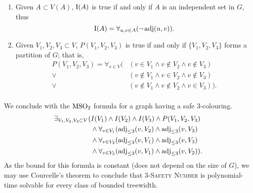 \begin{solution}
\begin{enumerate}
        \item Given $A \subset V(A)$, $\operatorname{I}(A)$ is true if and only if $A$ is an independent set in $G$, thus
              \[ \operatorname{I}(A) = \forall_{u, v \in A} (\lnot\operatorname{adj}(u, v)). \]
        \item Given $V_1, V_2, V_3 \subset V$, $P(V_1,V_2,V_3)$ is true if and only if $\{V_1, V_2, V_3\}$ forms a partition of $G$; that is,
              \begin{align*}
                  P(V_1, V_2, V_3) = \forall_{v \in V}( & (v \in V_1 \land v \not\in V_2 \land v \not\in V_3)   \\
                  \lor                                  & (v \not\in V_1 \land v \in V_2 \land v \not\in V_3)   \\
                  \lor                                  & (v \not\in V_1 \land v \not\in V_2 \land v \in V_3)). \\
              \end{align*}
    \end{enumerate}
    We conclude with the $\operatorname{MSO_2}$ formula for a graph having a safe $3$-colouring.
    \begin{align*}
        \exists_{V_1, V_2, V_3 \subset V} ( & I(V_1) \land I(V_2) \land I(V_3) \land P(V_1, V_2, V_3)                     \\
        & \land\forall_{v \in V_1} (\operatorname{adj}_{\leq 3}(v, V_2) \land \operatorname{adj}_{\leq 3}(v, V_3) \\
        & \land\forall_{v \in V_2} (\operatorname{adj}_{\leq 3}(v, V_1) \land \operatorname{adj}_{\leq 3}(v, V_3) \\
        & \land\forall_{v \in V_3} (\operatorname{adj}_{\leq 3}(v, V_1) \land \operatorname{adj}_{\leq 3}(v, V_2)).
    \end{align*}
    As the bound for this formula is constant (does not depend on the size of $G$), we may use Courcelle's theorem to conclude that \textsc{$3$-Safety Number} is polynomial-time solvable for every class of bounded treewidth. 
\end{solution}